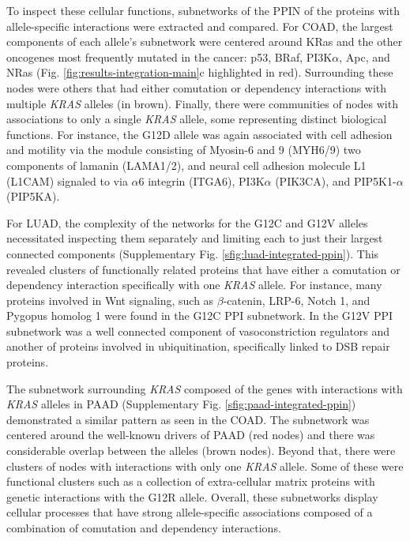 \documentclass[english, 10pt, letterpaper]{article}
\newcommand{\KRAS}{\emph{KRAS}}
\newcommand{\kras}{KRas}
\begin{document}
To inspect these cellular functions, subnetworks of the PPIN of the proteins with allele-specific interactions were extracted and compared.
For COAD, the largest components of each allele's subnetwork were centered around \kras{} and the other oncogenes most frequently mutated in the cancer: p53, BRaf, PI3K$\alpha$, Apc, and NRas (Fig. \ref{fig:results-integration-main}c highlighted in red).
Surrounding these nodes were others that had either comutation or dependency interactions with multiple \KRAS{} alleles (in brown).
Finally, there were communities of nodes with associations to only a single \KRAS{} allele, some representing distinct biological functions.
For instance, the G12D allele was again associated with cell adhesion and motility via the module consisting of Myosin-6 and 9 (MYH6/9) two components of lamanin (LAMA1/2), and neural cell adhesion molecule L1 (L1CAM) signaled to via $\alpha$6 integrin (ITGA6), PI3K$\alpha$ (PIK3CA), and PIP5K1-$\alpha$ (PIP5KA).

For LUAD, the complexity of the networks for the G12C and G12V alleles necessitated inspecting them separately and limiting each to just their largest connected components (Supplementary Fig. \ref{sfig:luad-integrated-ppin}).
This revealed clusters of functionally related proteins that have either a comutation or dependency interaction specifically with one \KRAS{} allele.
For instance, many proteins involved in Wnt signaling, such as $\beta$-catenin, LRP-6, Notch 1, and Pygopus homolog 1 were found in the G12C PPI subnetwork.
In the G12V PPI subnetwork was a well connected component of vasoconstriction regulators and another of proteins involved in ubiquitination, specifically linked to DSB repair proteins.

The subnetwork surrounding \KRAS{} composed of the genes with interactions with \KRAS{} alleles in PAAD (Supplementary Fig. \ref{sfig:paad-integrated-ppin}) demonstrated a similar pattern as seen in the COAD.
The subnetwork was centered around the well-known drivers of PAAD (red nodes) and there was considerable overlap between the alleles (brown nodes).
Beyond that, there were clusters of nodes with interactions with only one \KRAS{} allele.
Some of these were functional clusters such as a collection of extra-cellular matrix proteins with genetic interactions with the G12R allele.
Overall, these subnetworks display cellular processes that have strong allele-specific associations composed of a combination of comutation and dependency interactions.
\end{document}
